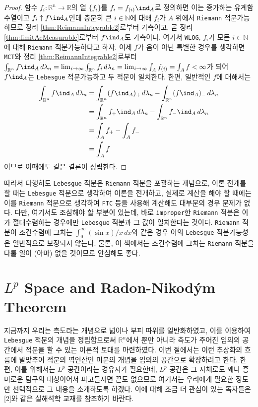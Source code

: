 \begin{proof}
    함수 $f_i:\mathbb{R}^n\to\mathbb{R}$의 열 $\{f_i\}$를 $f_i=f_{(i)}\ind_A$로 정의하면 이는 증가하는 유계함수열이고 $f_i\uparrow f\ind_A$인데 충분히 큰 $i\in\mathbb{N}$에 대해 $f_i$가 $A$ 위에서 \texttt{Riemann} 적분가능하므로 정리 \ref{thm:ReimannIntegrable2}로부터 가측이고, 곧 정리 \ref{thm:limitAeMeasurable}로부터 $f\ind_A$도 가측이다. 여기서 \texttt{WLOG}, $f_i$가 모든 $i\in\mathbb{N}$에 대해 \texttt{Riemann} 적분가능하다고 하자. 이제 $f$가 음이 아닌 특별한 경우를 생각하면 \texttt{MCT}와 정리 \ref{thm:ReimannIntegrable2}로부터 $\int_{\mathbb{R}^n}f\ind_A\,d\lambda_n=\lim_{i\to\infty}\int_{\mathbb{R}^n}f_i\,d\lambda_n=\lim_{i\to\infty}\int_Af_{(i)}=\int_Af<\infty$가 되어 $f\ind_A$는 \texttt{Lebesgue} 적분가능하고 두 적분이 일치한다. 한편, 일반적인 $f$에 대해서는
    \begin{align*}
        \int_{\mathbb{R}^n}f\ind_A\,d\lambda_n&=\int_{\mathbb{R}^n}(f\ind_A)_+\,d\lambda_n-\int_{\mathbb{R}^n}(f\ind_A)_-\,d\lambda_n\\
        &=\int_{\mathbb{R}^n}f_+\ind_A\,d\lambda_n-\int_{\mathbb{R}^n}f_-\ind_A\,d\lambda_n\\
        &=\int_Af_+-\int_Af_-\\
        &=\int_Af
    \end{align*}
    이므로 이때에도 같은 결론이 성립한다.
\end{proof}

따라서 다행히도 \texttt{Lebesgue} 적분은 \texttt{Riemann} 적분을 포괄하는 개념으로, 이론 전개를 할 때는 \texttt{Lebesgue} 적분으로 생각하여 이론을 전개하고, 실제로 계산을 해야 할 때에는 이를 \texttt{Riemann} 적분으로 생각하여 \texttt{FTC} 등을 사용해 계산해도 대부분의 경우 문제가 없다. 다만, 여기서도 조심해야 할 부분이 있는데, 바로 \texttt{improper}한 \texttt{Riemann} 적분은 이가 절대수렴하는 경우에만 \texttt{Lebesgue} 적분과 그 값이 일치한다는 것이다. \texttt{Riemann} 적분이 조건수렴에 그치는 $\int_0^\infty(\sin x)/x\,dx$와 같은 경우 이의 \texttt{Lebesgue} 적분가능성은 일반적으로 보장되지 않는다. 물론, 이 책에서는 조건수렴에 그치는 \texttt{Riemann} 적분을 다룰 일이 (아마) 없을 것이므로 안심해도 좋다.

\section{$L^p$ Space and Radon-Nikod\'ym Theorem}

지금까지 우리는 측도라는 개념으로 넓이나 부피 따위를 일반화하였고, 이를 이용하여 \texttt{Lebesgue} 적분의 개념을 정립함으로써 $\mathbb{R}^n$에서 뿐만 아니라 측도가 주어진 임의의 공간에서 적분을 할 수 있는 이론적 토대를 마련하였다. 이번 절에서는 이런 추상화의 흐름에 발맞추어 적분의 역연산인 미분의 개념을 임의의 공간으로 확장하려고 한다. 한편, 이를 위해서는 $L^p$ 공간이라는 경유지가 필요한데, $L^p$ 공간은 그 자체로도 꽤나 흥미로운 탐구의 대상이어서 파고들자면 끝도 없으므로 여기서는 우리에게 필요한 정도만 선택적으로 그 내용을 소개하도록 하겠다. 이에 대해 조금 더 관심이 있는 독자들은 [2]와 같은 실해석학 교재를 참조하기 바란다.

